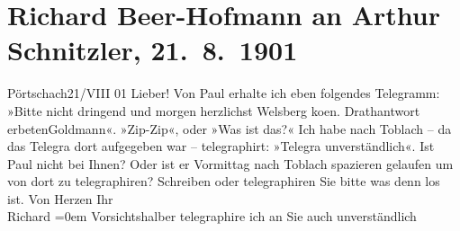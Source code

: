 

         
         \renewcommand{\erwaehntePersonen}{Personen: Richard Beer-Hofmann, Paul Goldmann}
         \renewcommand{\erwaehnteOrte}{Orte: Pörtschach, Toblach, Welsberg-Taisten}
         \renewcommand{\erwaehnteWerke}{}
               \section[Richard Beer-Hofmann an Arthur Schnitzler, 21. 8. 1901]{ Richard Beer-Hofmann an Arthur Schnitzler, 21. 8. 1901}\nopagebreak{}\rehead{ }\begin{ledgroupsized}[t]{13cm}\normalsize\beginnumbering \toendnotes[C]{\smallbreak\pagebreak[2]} 
\pstart
           \raggedleft{}{\pb}Pörtschach21/VIII 01\pend
           \pstart
           Lieber! Von Paul erhalte ich
               eben folgendes Telegramm:\pend
           \pstart
           »Bitte nicht dringend und morgen herzlichst Welsberg ko{\geminationm}en. Drathantwort
                  erbeten\hspace*{1.5em}Goldmann«.\pend
           \pstart
           »Zip-Zip«, oder »Was ist das?« Ich habe nach Toblach – da das Telegra{\geminationm} dort aufgegeben war –
               telegraphirt: »Telegra{\geminationm} unverständlich«.\pend
           \pstart
           Ist Paul nicht bei Ihnen? Oder ist er
               Vormittag nach Toblach spazieren gelaufen um von
               dort zu tele{\pb}graphiren? Schreiben
               oder telegraphiren Sie bitte was denn los ist.\pend
           \pstart
           Von Herzen Ihr{\\[\baselineskip]}\spacefill\mbox{Richard}\pend
           \leftskip=0em{}\pstart
           Vorsichtshalber telegraphire ich an Sie auch unverständlich\pend
           
         
         \endnumbering{}\end{ledgroupsized}  \newcommand{\dateiname}{L01166}\newcommand{\titel}{Richard Beer-Hofmann an Arthur Schnitzler, 21. 8. 1901}\newcommand{\editorInnen}{Martin Anton Müller und Gerd-Hermann Susen}
      